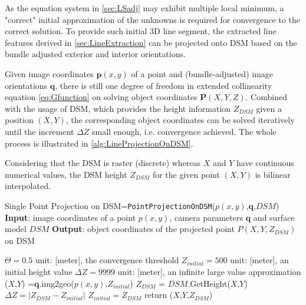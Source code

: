 As the equation system in \cref{sec:LSadj} may exhibit multiple local minimum, a "correct" initial approximation of the unknowns is required for convergence to the correct solution. To provide such initial 3D line segment, the extracted line features derived in \cref{sec:LineExtraction} can be projected onto DSM based on the bundle adjusted exterior and interior orientations.

Given image coordinates $\mathbf{p}(x,y)$ of a point and (bundle-adjusted) image orientations $\mathbf{q}$, there is still one degree of freedom in extended collinearity equation \eqref{eq:Gfunction} on solving object coordinates $\mathbf{P}(X,Y,Z)$. Combined with the usage of DSM, which provides the height information $Z_{DSM}$ given a position $(X,Y)$, the corresponding object coordinates can be solved iteratively until the increment $\Delta Z$ small enough, i.e. convergence achieved. The whole process is illustrated in \cref{alg:LineProjectionOnDSM}.

Considering that the DSM is raster (discrete) whereas $X$ and $Y$ have continuous numerical values, the DSM height $Z_{DSM}$ for the given point $(X,Y)$ is bilinear interpolated.

\begin{Algorithmus}
\caption{Single Point Projection on DSM\newline
	[$X$,$Y$,$Z_{DSM}$]=\texttt{PointProjectionOnDSM}($p(x,y)$,$\mathbf{q}$,$DSM$)\newline
	\textbf{Input}: image coordinates of a point $p(x,y)$, 
					camera parameters $\mathbf{q}$ and
					surface model $DSM$\newline
	\textbf{Output}: object coordinates of the projected point $P(X,Y,Z_{DSM})$ on DSM
}
\label{alg:LineProjectionOnDSM}
\begin{algorithmic}
\State $\Theta=0.5$
\Comment unit: [meter], the convergence threshold
\State $Z_{initial}=500$
\Comment unit: [meter], an initial height value
\State $\Delta Z=9999$
\Comment unit: [meter], an infinite large value approximation
	\State ($X$,$Y$) =$\mathbf{q}$.img2geo($p(x,y)$,$Z_{initial}$)
	\State $Z_{DSM}$ = $DSM$.GetHeight($X$,$Y$)
	\State $\Delta Z=|Z_{DSM}-Z_{initial}|$
	\State $Z_{initial}=Z_{DSM}$
\EndWhile
\State return ($X$,$Y$,$Z_{DSM}$)

\end{algorithmic}
\end{Algorithmus}



